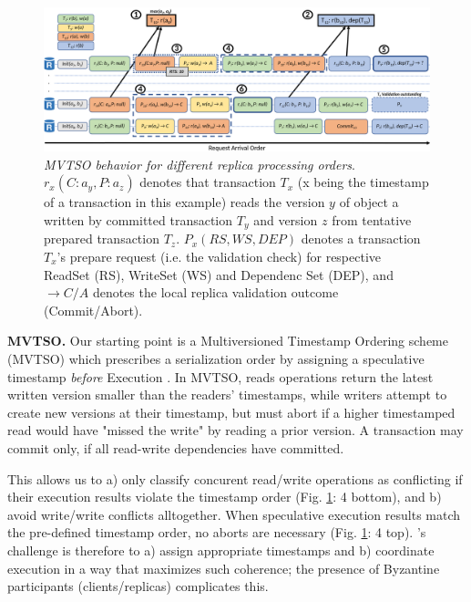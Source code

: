 \begin{figure}
\begin{center}
\includegraphics[width= \textwidth]{./figures/MVTSOLargeFont.png}
\end{center}
\caption{\emph{MVTSO behavior for different replica processing orders}. $r_x(C : a_y ,P : a_z)$ denotes that transaction $T_x$ (x being the timestamp of a transaction in this example) reads the version $y$ of object a written by committed transaction $T_y$ and version $z$ from tentative prepared transaction $T_z$. $P_x(RS,WS,DEP)$ denotes a transaction $T_x$'s prepare request (i.e. the validation check) for respective ReadSet (RS), WriteSet (WS) and Dependenc Set (DEP), and $\rightarrow C / A$ denotes the local replica validation outcome (Commit/Abort).} 
\label{fig:MVTSOEX}
\end{figure}

\par \textbf{MVTSO.} Our starting point is a Multiversioned Timestamp Ordering scheme (MVTSO) which prescribes a serialization order by assigning a speculative timestamp \textit{before} Execution \cite{bernstein1983multiversion, reed1983implementing, su2017tebaldi}. In MVTSO, reads operations return the latest written version smaller than the readers' timestamps, while writers attempt to create new versions at their timestamp, but must abort if a higher timestamped read would have "missed the write" by reading a prior version. A transaction may commit only, if all read-write dependencies have committed.

\iffalse
{}  This allows us to a) only classify concurent read/write operations as conflicting if their execution results violate the timestamp order (Fig. \ref{fig:MVTSOEX}: 4 bottom), and b) avoid write/write conflicts alltogether. 
When speculative execution results match the pre-defined timestamp order, no aborts are necessary (Fig. \ref{fig:MVTSOEX}: 4 top). \sys{}'s challenge is therefore to a) assign appropriate timestamps and b) coordinate execution in a way that maximizes such coherence; the presence of Byzantine participants (clients/replicas) complicates this.

